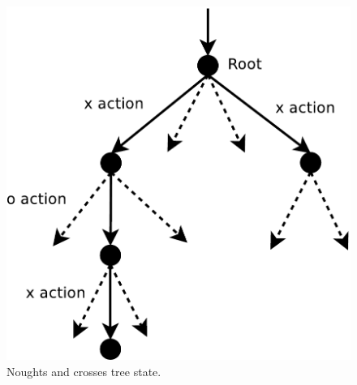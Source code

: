 \documentclass[12pt]{article}
\begin{document}
\begin{figure}[htbp!]
\centering
	\includegraphics[scale=0.4]{images/ttt_tree}
	\caption{Noughts and crosses tree state.}
	\label{fig:ttt_tree}
\end{figure}
\end{document}
